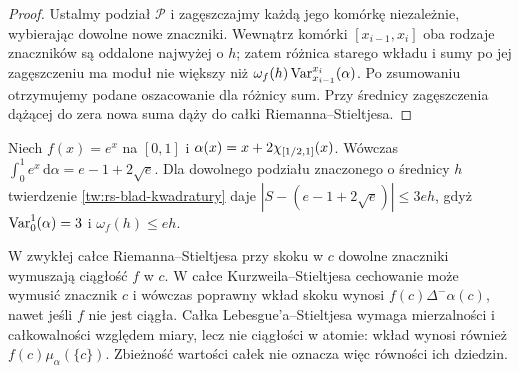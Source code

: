 \begin{proof}
Ustalmy podział $\mathcal P$ i zagęszczajmy każdą jego komórkę niezależnie, wybierając dowolne nowe znaczniki. Wewnątrz komórki $[x_{i-1},x_i]$ oba rodzaje znaczników są oddalone najwyżej o $h$; zatem różnica starego wkładu i sumy po jej zagęszczeniu ma moduł nie większy niż $\omega_f(h)\operatorname{Var}_{x_{i-1}}^{x_i}(\alpha)$. Po zsumowaniu otrzymujemy podane oszacowanie dla różnicy sum. Przy średnicy zagęszczenia dążącej do zera nowa suma dąży do całki Riemanna--Stieltjesa.
\end{proof}
\begin{przyklad}
Niech $f(x)=e^x$ na $[0,1]$ i $\alpha(x)=x+2\chi_{[1/2,1]}(x)$. Wówczas
$\int_0^1e^x\,\mathrm d\alpha=e-1+2\sqrt e$.
Dla dowolnego podziału znaczonego o średnicy $h$ twierdzenie \ref{tw:rs-blad-kwadratury} daje
$|S-(e-1+2\sqrt e)|\le 3eh$, gdyż $\operatorname{Var}_0^1(\alpha)=3$ i $\omega_f(h)\le eh$.
\end{przyklad}
\begin{uwaga}
W zwykłej całce Riemanna--Stieltjesa przy skoku w $c$ dowolne znaczniki wymuszają ciągłość $f$ w $c$. W całce Kurzweila--Stieltjesa cechowanie może wymusić znacznik $c$ i wówczas poprawny wkład skoku wynosi $f(c)\Delta^-\alpha(c)$, nawet jeśli $f$ nie jest ciągła. Całka Lebesgue'a--Stieltjesa wymaga mierzalności i całkowalności względem miary, lecz nie ciągłości w atomie: wkład wynosi również $f(c)\mu_\alpha(\{c\})$. Zbieżność wartości całek nie oznacza więc równości ich dziedzin.
\end{uwaga}

